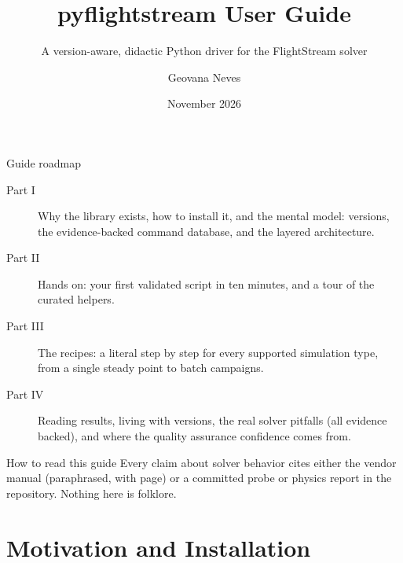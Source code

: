 \documentclass[aspectratio=169,10pt]{beamer}
\title[pyflightstream User Guide]{pyflightstream User Guide}
\subtitle{A version-aware, didactic Python driver for the FlightStream solver}
\author[G. Neves]{Geovana Neves}
\institute[]{pyflightstream 0.58.2, MIT licensed}
\date{November 2026}
\begin{document}
\begin{frame}
  \titlepage
\end{frame}

\begin{frame}{Guide roadmap}
  \small
  \begin{description}
    \item[Part I] Why the library exists, how to install it, and the mental model: versions, the evidence-backed command database, and the layered architecture.
    \item[Part II] Hands on: your first validated script in ten minutes, and a tour of the curated helpers.
    \item[Part III] The recipes: a literal step by step for every supported simulation type, from a single steady point to batch campaigns.
    \item[Part IV] Reading results, living with versions, the real solver pitfalls (all evidence backed), and where the quality assurance confidence comes from.
  \end{description}
  \begin{block}{How to read this guide}
    Every claim about solver behavior cites either the vendor manual (paraphrased, with page) or a committed probe or physics report in the repository. Nothing here is folklore.
  \end{block}
\end{frame}

\section{Motivation and Installation}
\end{document}
